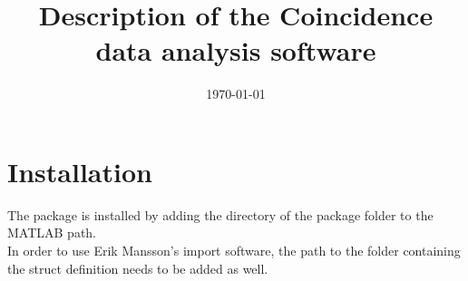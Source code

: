 \newpage


\title{Description of the Coincidence data analysis software}
\date{\today} %


\maketitle
\tableofcontents
\newpage






%


\section{Installation}
The package is installed by adding the directory of the package folder to the MATLAB path.\\
In order to use Erik Mansson's import software, the path to the folder containing the struct definition needs to be added as well.


